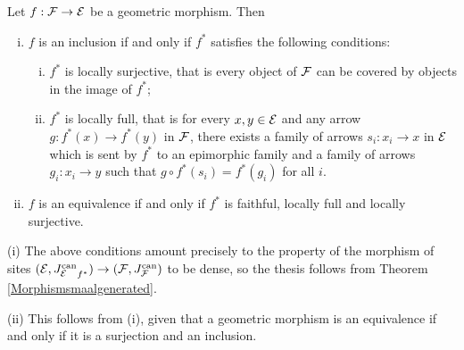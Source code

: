 \documentclass[a4paper,12pt]{article}
\begin{document}
\begin{corollary}\label{corinclusionequivalence}
	Let $f:{\cal F}\to {\cal E}$ be a geometric morphism. Then 
	
	\begin{enumerate}[(i)]
	\item $f$ is an inclusion if and only if $f^{\ast}$ satisfies the following conditions:
	

		\begin{enumerate}[(i)]	
			\item \textup{$f^{\ast}$ is locally surjective}, that is every object of $\cal F$ can be covered by objects in the image of $f^{\ast}$;
			
			\item \textup{$f^{\ast}$ is locally full}, that is for every $x, y\in {\cal E}$ and any arrow $g:f^{\ast}(x)\to f^{\ast}(y)$ in $\cal F$, there exists a family of arrows $s_{i}:x_{i}\to x$ in $\cal E$ which is sent by $f^{\ast}$ to an epimorphic family and a family of arrows $g_{i}:x_{i}\to y$ such that $g\circ f^{\ast}(s_{i})=f^{\ast}(g_{i})$ for all $i$.
		\end{enumerate}
	
	\item $f$ is an equivalence if and only if $f^{\ast}$ is faithful, locally full and locally surjective.

	\end{enumerate}
\end{corollary}



\begin{proofs}
	(i) The above conditions amount precisely to the property of the morphism of sites $({\cal E}, {J_{\cal E}^{\textup{can}}}_{f^{\ast}})\to ({\cal F}, J_{\cal F}^{\textup{can}})$ to be dense, so the thesis follows from Theorem \ref{Morphismsmaalgenerated}. 
	
	(ii) This follows from (i), given that a geometric morphism is an equivalence if and only if it is a surjection and an inclusion.
\end{proofs}
\end{document}
